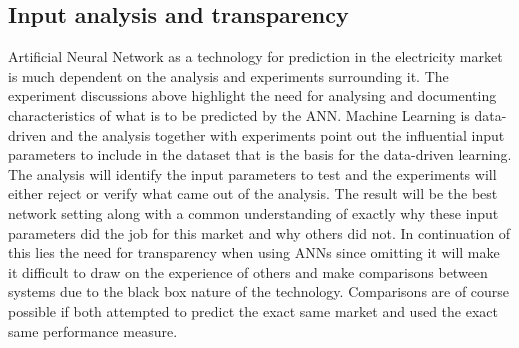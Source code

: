 \subsection{Input analysis and transparency}
Artificial Neural Network as a technology for prediction in the electricity market is much dependent on the analysis and experiments surrounding it. The experiment discussions above highlight the need for analysing and documenting characteristics of what is to be predicted by the ANN. Machine Learning is data-driven\cite{18} and the analysis together with experiments point out the influential input parameters to include in the dataset that is the basis for the data-driven learning. The analysis will identify the input parameters to test and the experiments will either reject or verify what came out of the analysis. The result will be the best network setting along with a common understanding of exactly why these input parameters did the job for this market and why others did not. In continuation of this lies the need for transparency when using ANNs since omitting it will make it difficult to draw on the experience of others and make comparisons between systems due to the black box nature of the technology. Comparisons are of course possible if both attempted to predict the exact same market and used the exact same performance measure. 

